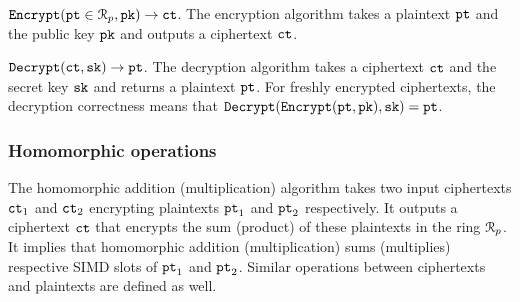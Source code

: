 ${\mathtt{Encrypt}}({\mathtt{pt}} \in \mathcal{R}_p, {\mathtt{pk}}) \rightarrow {\mathtt{ct}}$. The encryption algorithm takes a plaintext ${\mathtt{pt}}$ and the public key ${\mathtt{pk}}$ and outputs a ciphertext ${\mathtt{ct}}$.

${\mathtt{Decrypt}}({\mathtt{ct}}, {\mathtt{sk}}) \rightarrow {\mathtt{pt}}$. The decryption algorithm takes a ciphertext ${\mathtt{ct}}$ and the secret key ${\mathtt{sk}}$ and returns a plaintext ${\mathtt{pt}}$.
For freshly encrypted ciphertexts, the decryption correctness means that ${\mathtt{Decrypt}}({\mathtt{Encrypt}}({\mathtt{pt}}, {\mathtt{pk}}), {\mathtt{sk}}) = {\mathtt{pt}}$. 


\subsubsection{Homomorphic operations}

The homomorphic addition (multiplication) algorithm takes two input ciphertexts ${\mathtt{ct}}_1$ and ${\mathtt{ct}}_2$ encrypting plaintexts ${\mathtt{pt}}_1$ and ${\mathtt{pt}}_2$ respectively.
It outputs a ciphertext ${\mathtt{ct}}$ that encrypts the sum (product) of these plaintexts in the ring $\mathcal{R}_p$.
It implies that homomorphic addition (multiplication) sums (multiplies) respective SIMD slots of ${\mathtt{pt}}_1$ and ${\mathtt{pt}}_2$.
Similar operations between ciphertexts and plaintexts are defined as well.  






